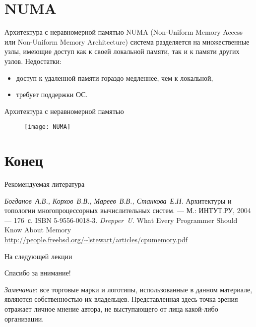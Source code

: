 \section{NUMA}

\begin{frame}{Архитектура с неравномерной памятью}
NUMA (Non-Uniform Memory Access или Non-Uniform Memory Architecture) система разделяется на множественные узлы, имеющие доступ как к своей локальной памяти, так и к памяти других узлов.
\vfill
Недостатки:
\begin{itemize}
    \item доступ к удаленной памяти гораздо медленнее, чем к локальной,
    \item требует поддержки ОС.
\end{itemize}
\end{frame}

\begin{frame}{Архитектура с неравномерной памятью}
\begin{figure}[htpb]
    \centering
    \texttt{[image: NUMA]}
\end{figure}
\end{frame}

\section*{Конец}

\begin{frame}[allowframebreaks]{Рекомендуемая литература}
\begin{thebibliography}{99}
    \bibitem{} \textit{Богданов~А.В., Корхов~В.В., Мареев~В.В., Станкова~Е.Н.}
    Архитектуры и топологии многопроцессорных вычислительных систем. --- М.:
    ИНТУТ.РУ, 2004 --- 176~с. ISBN 5-9556-0018-3.
    \bibitem{} \textit{Drepper~U.} What Every Programmer Should Know About Memory
    \url{http://people.freebsd.org/~lstewart/articles/cpumemory.pdf}
\end{thebibliography}
\end{frame}

\begin{frame}{На следующей лекции}
\end{frame}

\begin{frame}

{\huge{Спасибо за внимание!}\par}

\vfill

\tiny{\textit{Замечание}: все торговые марки и логотипы, использованные в данном материале, являются собственностью их владельцев. Представленная здесь точка зрения отражает личное мнение автора, не выступающего от лица какой-либо организации.}

\end{frame}


